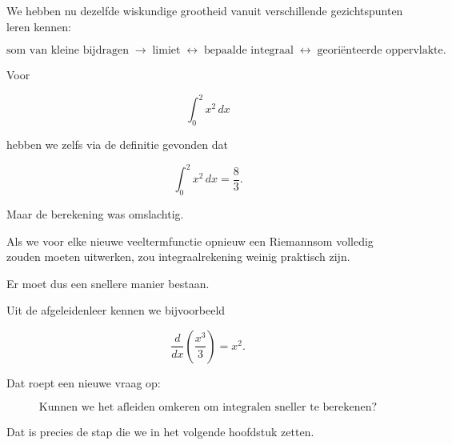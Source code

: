\documentclass{ximera}
\begin{document}


We hebben nu dezelfde wiskundige grootheid vanuit verschillende
gezichtspunten leren kennen:

\[
\text{som van kleine bijdragen}
\;\longrightarrow\;
\text{limiet}
\;\longleftrightarrow\;
\text{bepaalde integraal}
\;\longleftrightarrow\;
\text{georiënteerde oppervlakte}.
\]

Voor

\[
\int_0^2x^2\,dx
\]

hebben we zelfs via de definitie gevonden dat

\[
\int_0^2x^2\,dx=\frac83.
\]

Maar de berekening was omslachtig.

Als we voor elke nieuwe veeltermfunctie opnieuw een Riemannsom volledig
zouden moeten uitwerken, zou integraalrekening weinig praktisch zijn.

Er moet dus een snellere manier bestaan.

Uit de afgeleidenleer kennen we bijvoorbeeld

\[
\frac{d}{dx}\left(\frac{x^3}{3}\right)=x^2.
\]

Dat roept een nieuwe vraag op:

\[
\boxed{
\text{Kunnen we het afleiden omkeren om integralen sneller te berekenen?}
}
\]

Dat is precies de stap die we in het volgende hoofdstuk zetten.
\end{document}
